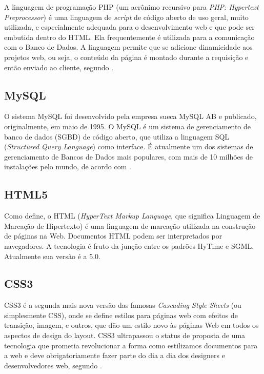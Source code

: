 A linguagem de programação PHP (um acrônimo recursivo para \textit{PHP: Hypertext Preprocessor}) é uma linguagem de \textit{script} de código aberto de uso geral, muito utilizada, e especialmente adequada para o desenvolvimento web e que pode ser embutida dentro do HTML. Ela frequentemente é utilizada para a comunicação com o Banco de Dados. A linguagem permite que se adicione dinamicidade aos projetos web, ou seja, o conteúdo da página é montado durante a requisição e então enviado ao cliente, segundo .

\subsection{MySQL}

O sistema MySQL foi desenvolvido pela empresa sueca MySQL AB e publicado, originalmente, em maio de 1995. O MySQL é um sistema de gerenciamento de banco de dados (SGBD) de código aberto, que utiliza a linguagem SQL (\textit{Structured Query Language}) como interface. É atualmente um dos sistemas de gerenciamento de Bancos de Dados mais populares, com mais de 10 milhões de instalações pelo mundo, de acordo com \cite{miletto2014desenvolvimento}.

\subsection{HTML5}

Como  define, o HTML (\textit{HyperText Markup Language}, que significa Linguagem de Marcação de Hipertexto) é uma linguagem de marcação utilizada na construção de páginas na Web. Documentos HTML podem ser interpretados por navegadores. A tecnologia é fruto da junção entre os padrões HyTime e SGML. Atualmente sua versão é a 5.0.

\subsection{CSS3}

CSS3 é a segunda mais nova versão das famosas \textit{Cascading Style Sheets} (ou simplesmente CSS), onde se define estilos para páginas web com efeitos de transição, imagem, e outros, que dão um estilo novo às páginas Web em todos os aspectos de design do layout. CSS3 ultrapassou o status de proposta de uma tecnologia que prometia revolucionar a forma como estilizamos documentos para a web e deve obrigatoriamente fazer parte do dia a dia dos designers e desenvolvedores web, segundo .

